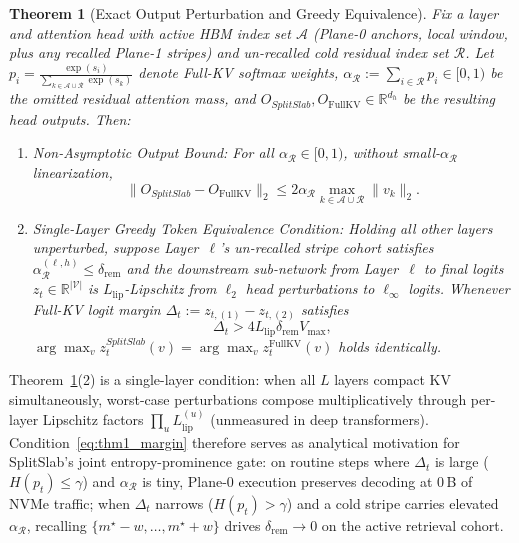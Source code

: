 \documentclass[10pt,journal,compsoc]{IEEEtran}
\newtheorem{theorem}{Theorem}
\theoremstyle{definition}
\theoremstyle{remark}
\newcommand{\SplitSlab}{\textup{\textsc{SplitSlab}}}
\newcommand{\R}{\mathbb{R}}
\def\SplitSlab{SplitSlab}%
\begin{document}
\begin{theorem}[Exact Output Perturbation and Greedy Equivalence]\label{thm:perturbation}
Fix a layer and attention head with active HBM index set $\mathcal{A}$ (Plane-0 anchors, local window, plus any recalled Plane-1 stripes) and un-recalled cold residual index set $\mathcal{R}$. Let $p_i = \frac{\exp(s_i)}{\sum_{k \in \mathcal{A} \cup \mathcal{R}} \exp(s_k)}$ denote Full-KV softmax weights, $\alpha_{\mathcal{R}} := \sum_{i \in \mathcal{R}} p_i \in [0, 1)$ be the omitted residual attention mass, and $O_{\SplitSlab}, O_{\mathrm{FullKV}} \in \R^{d_h}$ be the resulting head outputs. Then:
\begin{enumerate}
  \item \emph{Non-Asymptotic Output Bound:} For all $\alpha_{\mathcal{R}} \in [0, 1)$, without small-$\alpha_{\mathcal{R}}$ linearization,
  \begin{equation}\label{eq:thm1_l2}
  \|O_{\SplitSlab} - O_{\mathrm{FullKV}}\|_2 \le 2 \alpha_{\mathcal{R}} \max_{k \in \mathcal{A} \cup \mathcal{R}} \|v_k\|_2.
  \end{equation}
  \item \emph{Single-Layer Greedy Token Equivalence Condition:} Holding all other layers unperturbed, suppose Layer~$\ell$'s un-recalled stripe cohort satisfies $\alpha_{\mathcal{R}}^{(\ell,h)} \le \delta_{\mathrm{rem}}$ and the downstream sub-network from Layer~$\ell$ to final logits $z_t \in \R^{|\mathcal{V}|}$ is $L_{\mathrm{lip}}$-Lipschitz from $\ell_2$ head perturbations to $\ell_\infty$ logits. Whenever Full-KV logit margin $\Delta_t := z_{t,(1)} - z_{t,(2)}$ satisfies
  \begin{equation}\label{eq:thm1_margin}
  \Delta_t > 4 L_{\mathrm{lip}} \delta_{\mathrm{rem}} V_{\max},
  \end{equation}
  $\arg\max_v z_t^{\SplitSlab}(v) = \arg\max_v z_t^{\mathrm{FullKV}}(v)$ holds identically.
\end{enumerate}
\end{theorem}

Theorem~\ref{thm:perturbation}(2) is a single-layer condition: when all $L$ layers compact KV simultaneously, worst-case perturbations compose multiplicatively through per-layer Lipschitz factors $\prod_{u} L_{\mathrm{lip}}^{(u)}$ (unmeasured in deep transformers). Condition~\eqref{eq:thm1_margin} therefore serves as analytical motivation for \SplitSlab{}'s joint entropy-prominence gate: on routine steps where $\Delta_t$ is large ($H(p_t) \le \gamma$) and $\alpha_{\mathcal{R}}$ is tiny, Plane-0 execution preserves decoding at $0$\,B of NVMe traffic; when $\Delta_t$ narrows ($H(p_t) > \gamma$) and a cold stripe carries elevated $\alpha_{\mathcal{R}}$, recalling $\{m^\star - w,\dots,m^\star + w\}$ drives $\delta_{\mathrm{rem}} \to 0$ on the active retrieval cohort.
\end{document}
